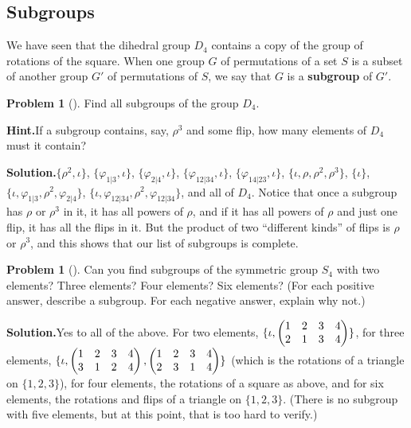 \documentclass[10pt,]{book}
\newcommand{\terminology}[1]{\textbf{#1}}
\theoremstyle{plain}
\theoremstyle{definition}
\newtheorem{activity}[project]{Problem}
\theoremstyle{definition}
\numberwithin{equation}{chapter}
\newcommand{\amp}{&}
\begin{document}
\subsection[{Subgroups}]{Subgroups}\label{subsection-55}
We have seen that the dihedral group \(D_4\) contains a copy of the group of rotations of the square. When one group \(G\) of permutations of a set \(S\) is a subset of another group \(G'\) of permutations of \(S\), we say that \(G\) is a \terminology{subgroup} of \(G'\). %
\begin{activity}[]\label{S4}
Find all subgroups of the group \(D_4\).%
\par\medskip\noindent%
\textbf{Hint.}\quad If a subgroup contains, say, \(\rho^3\) and some flip, how many elements of \(D_4\) must it contain?%
\par\medskip\noindent%
\textbf{Solution.}\quad \(\{\rho^2,\!\iota\}\), \(\{\varphi_{1|3},\!\iota\}\), \(\{\varphi_{2|4},\!\iota\}\), \(\{\varphi_{12|34},\!\iota\}\), \(\{\varphi_{14|23},\!\iota\}\), \(\{\iota,\rho,\rho^2,\rho^3\}\), \(\{\iota\}\), \(\{\iota,\varphi_{1|3},\rho^2,\varphi_{2|4}\}\), \(\{\iota,\varphi_{12|34},\rho^2,\varphi_{12|34}\}\), and all of \(D_4\). Notice that once a subgroup has \(\rho\) or \(\rho^3\) in it, it has all powers of \(\rho\), and if it has all powers of \(\rho\) and just one flip, it has all the flips in it. But the product of two ``different kinds'' of flips is \(\rho\) or \(\rho^3\), and this shows that our list of subgroups is complete.%
\end{activity}
\begin{activity}[]\label{activity-271}
Can you find subgroups of the symmetric group \(S_4\) with two elements? Three elements? Four elements? Six elements? (For each positive answer, describe a subgroup. For each negative answer, explain why not.)%
\par\medskip\noindent%
\textbf{Solution.}\quad Yes to all of the above. For two elements, \(\{\iota,\begin{pmatrix}1\amp 2\amp 3\amp 4\cr2\amp 1\amp 3\amp 4
\end{pmatrix} \}\), for three elements, \(\{\iota,\begin{pmatrix}1\amp 2\amp 3\amp 4\cr3\amp 1\amp 2\amp 4
\end{pmatrix} , \begin{pmatrix}1\amp 2\amp 3\amp 4\cr2\amp 3\amp 1\amp 4
\end{pmatrix} \}\) (which is the rotations of a triangle on \(\{1,2,3\}\)), for four elements, the rotations of a square as above, and for six elements, the rotations and flips of a triangle on \(\{1,2,3\}\). (There is no subgroup with five elements, but at this point, that is too hard to verify.)%
\end{activity}
\typeout{************************************************}
\typeout{************************************************}
\end{document}
